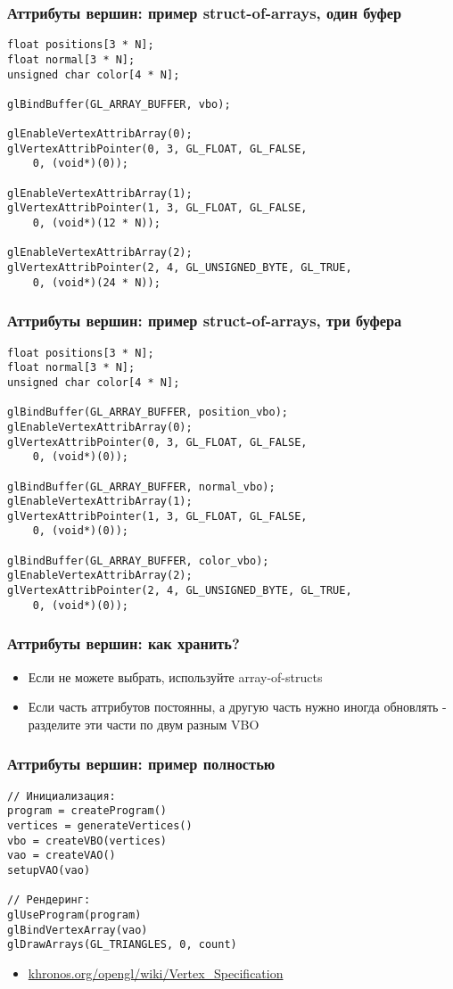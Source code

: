 \documentclass{beamer}
\begin{document}
\begin{frame}[fragile]
\frametitle{Аттрибуты вершин: пример struct-of-arrays, один буфер}
\fontsize{10pt}{10pt}
\begin{verbatim}
float positions[3 * N];
float normal[3 * N];
unsigned char color[4 * N];

glBindBuffer(GL_ARRAY_BUFFER, vbo);

glEnableVertexAttribArray(0);
glVertexAttribPointer(0, 3, GL_FLOAT, GL_FALSE,
    0, (void*)(0));

glEnableVertexAttribArray(1);
glVertexAttribPointer(1, 3, GL_FLOAT, GL_FALSE,
    0, (void*)(12 * N));
    
glEnableVertexAttribArray(2);
glVertexAttribPointer(2, 4, GL_UNSIGNED_BYTE, GL_TRUE,
    0, (void*)(24 * N));
\end{verbatim}
\end{frame}

\begin{frame}[fragile]
\frametitle{Аттрибуты вершин: пример struct-of-arrays, три буфера}
\fontsize{10pt}{10pt}
\begin{verbatim}
float positions[3 * N];
float normal[3 * N];
unsigned char color[4 * N];

glBindBuffer(GL_ARRAY_BUFFER, position_vbo);
glEnableVertexAttribArray(0);
glVertexAttribPointer(0, 3, GL_FLOAT, GL_FALSE,
    0, (void*)(0));

glBindBuffer(GL_ARRAY_BUFFER, normal_vbo);
glEnableVertexAttribArray(1);
glVertexAttribPointer(1, 3, GL_FLOAT, GL_FALSE,
    0, (void*)(0));

glBindBuffer(GL_ARRAY_BUFFER, color_vbo);
glEnableVertexAttribArray(2);
glVertexAttribPointer(2, 4, GL_UNSIGNED_BYTE, GL_TRUE,
    0, (void*)(0));
\end{verbatim}
\end{frame}

\begin{frame}[fragile]
\frametitle{Аттрибуты вершин: как хранить?}
\begin{itemize}
\item Если не можете выбрать, используйте array-of-structs
\pause
\item Если часть аттрибутов постоянны, а другую часть нужно иногда обновлять - разделите эти части по двум разным VBO
\end{itemize}
\end{frame}

\begin{frame}[fragile]
\frametitle{Аттрибуты вершин: пример полностью}
\begin{verbatim}
// Инициализация:
program = createProgram()
vertices = generateVertices()
vbo = createVBO(vertices)
vao = createVAO()
setupVAO(vao)

// Рендеринг:
glUseProgram(program)
glBindVertexArray(vao)
glDrawArrays(GL_TRIANGLES, 0, count)
\end{verbatim}
\pause
\begin{itemize}
\item \href{https://www.khronos.org/opengl/wiki/Vertex_Specification}{khronos.org/opengl/wiki/Vertex\_Specification}
\end{itemize}
\end{frame}
\end{document}
